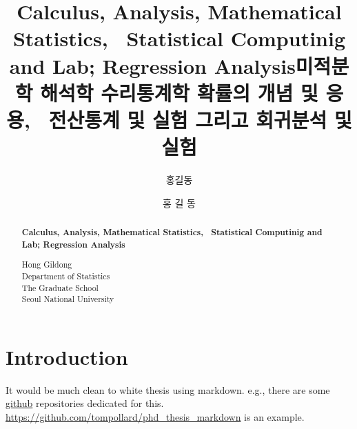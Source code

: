 \documentclass[oneside,phd,]{snuthesis}
\title{Calculus, Analysis, Mathematical Statistics, ~Statistical Computinig and
Lab; Regression Analysis}
\title*{미적분학 해석학 수리통계학 확률의 개념 및 응용, ~전산통계 및 실험 그리고
회귀분석 및 실험}
\author{홍길동}
\author*{홍 길 동} %
\begin{document}
\makefrontcover
\makefrontcover
\makeapproval

\cleardoublepage
{}

\begin{abstract}

\begin{center}
\LARGE
\begin{spacing}{0.9}
\textbf{
Calculus, Analysis, Mathematical Statistics, ~Statistical Computinig and
Lab; Regression Analysis}
\end{spacing}
\end{center}
\begin{flushright}
\begin{spacing}{0.9}
\Large
Hong Gildong \\
Department of Statistics \\
The Graduate School \\
Seoul National University
\end{spacing}
\end{flushright}

\noindent

\end{abstract}

\tableofcontents
\listoffigures
\listoftables

\cleardoublepage
{}

%
%

\chapter{Introduction}\label{introduction}

It would be much clean to white thesis using markdown. e.g., there are
some \href{https://github.com}{github} repositories dedicated for this.
\url{https://github.com/tompollard/phd_thesis_markdown} is an example.
\end{document}
